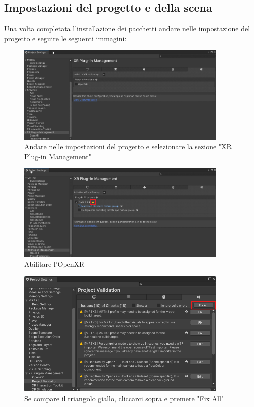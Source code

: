 \subsection{Impostazioni del progetto e della scena}
 Una volta completata l'installazione dei pacchetti andare nelle impostazione del progetto e seguire le seguenti immagini:
\begin{figure}[H]
    \centering
    \includegraphics[width=0.9\textwidth,height=\textheight,keepaspectratio]{figures/chapter_1/projectSetting1.png}
    \caption{Andare nelle impostazioni del progetto e selezionare la sezione "XR Plug-in Management"}
\end{figure}
\begin{figure}[H]
    \centering
    \includegraphics[width=0.9\textwidth,height=\textheight,keepaspectratio]{figures/chapter_1/projectSetting2.png}
    \caption{Abilitare l'OpenXR}
\end{figure}
\begin{figure}[H]
    \centering
    \includegraphics[width=0.9\textwidth,height=\textheight,keepaspectratio]{figures/chapter_1/projectSetting3.png}
    \caption{Se compare il triangolo giallo, cliccarci sopra e premere "Fix All"}
\end{figure}
